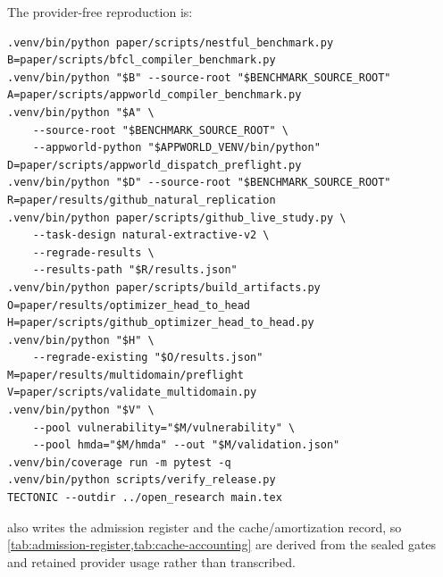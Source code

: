 The provider-free reproduction is:
\begin{verbatim}
.venv/bin/python paper/scripts/nestful_benchmark.py
B=paper/scripts/bfcl_compiler_benchmark.py
.venv/bin/python "$B" --source-root "$BENCHMARK_SOURCE_ROOT"
A=paper/scripts/appworld_compiler_benchmark.py
.venv/bin/python "$A" \
    --source-root "$BENCHMARK_SOURCE_ROOT" \
    --appworld-python "$APPWORLD_VENV/bin/python"
D=paper/scripts/appworld_dispatch_preflight.py
.venv/bin/python "$D" --source-root "$BENCHMARK_SOURCE_ROOT"
R=paper/results/github_natural_replication
.venv/bin/python paper/scripts/github_live_study.py \
    --task-design natural-extractive-v2 \
    --regrade-results \
    --results-path "$R/results.json"
.venv/bin/python paper/scripts/build_artifacts.py
O=paper/results/optimizer_head_to_head
H=paper/scripts/github_optimizer_head_to_head.py
.venv/bin/python "$H" \
    --regrade-existing "$O/results.json"
M=paper/results/multidomain/preflight
V=paper/scripts/validate_multidomain.py
.venv/bin/python "$V" \
    --pool vulnerability="$M/vulnerability" \
    --pool hmda="$M/hmda" --out "$M/validation.json"
.venv/bin/coverage run -m pytest -q
.venv/bin/python scripts/verify_release.py
TECTONIC --outdir ../open_research main.tex
\end{verbatim}
\code{build\_artifacts.py} also writes the admission register and the cache/amortization
record, so \cref{tab:admission-register,tab:cache-accounting} are derived from the sealed
gates and retained provider usage rather than transcribed.



